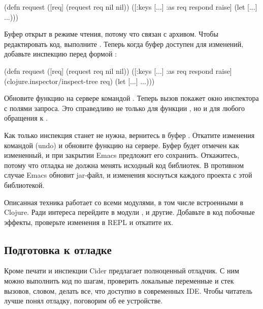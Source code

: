 \begin{english}
  \begin{clojure}
(defn request
  ([req] (request req nil nil))
  ([{:keys [...]
     :as req} respond raise]
   (let [...]
     ...)))
  \end{clojure}
\end{english}

Буфер  открыт в режиме чтения, потому что связан с архивом. Чтобы редактировать код, выполните . Теперь когда буфер доступен для изменений, добавьте инспекцию перед формой :

\begin{english}
  \begin{clojure}
(defn request
  ([req] (request req nil nil))
  ([{:keys [...]
     :as req} respond raise]
   (clojure.inspector/inspect-tree req)
   (let [...]
     ...)))
  \end{clojure}
\end{english}

Обновите функцию на сервере командой . Теперь вызов  покажет окно инспектора с полями запроса. Это справедливо не только для функции , но и для любого обращения к .

Как только инспекция станет не нужна, вернитесь в буфер . Откатите изменения командой  (undo) и обновите функцию на сервере. Буфер  будет отмечен как измененный, и при закрытии Emacs предложит его сохранить. Откажитесь, потому что отладка не должна менять исходный код библиотек. В противном случае Emacs обновит jar-файл, и изменения коснуться каждого проекта с этой библиотекой.

Описанная техника работает со всеми модулями, в том числе встроенными в Clojure. Ради интереса перейдите в модули ,  и другие. Добавьте в код побочные эффекты, проверьте изменения в REPL и откатите их.

\subsection{Подготовка к отладке}

Кроме печати и инспекции Cider предлагает полноценный отладчик. С ним можно выполнить код по шагам, проверить локальные переменные и стек вызовов, словом, делать все, что доступно в современных IDE. Чтобы читатель лучше понял отладку, поговорим об ее устройстве.

